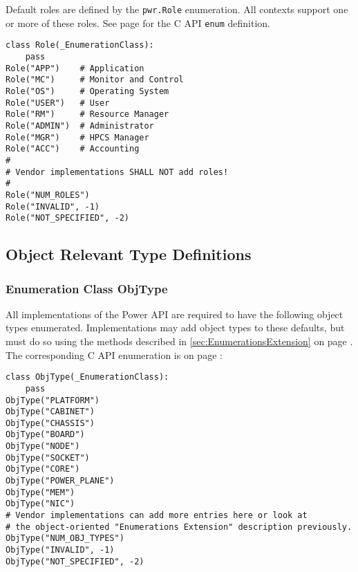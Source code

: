 \documentclass[12pt]{report} %
\begin{document}
\begin{appendices}
Default roles are defined by the \texttt{pwr.Role} enumeration. All
contexts support one or more of these roles. See page
\pageref{type:Role} for the C API \texttt{enum} definition.

\begin{center}\begin{minipage}{.95\linewidth}\begin{lstlisting}
class Role(_EnumerationClass):
    pass
Role("APP")    # Application
Role("MC")     # Monitor and Control
Role("OS")     # Operating System
Role("USER")   # User
Role("RM")     # Resource Manager
Role("ADMIN")  # Administrator
Role("MGR")    # HPCS Manager
Role("ACC")    # Accounting
#
# Vendor implementations SHALL NOT add roles!
#
Role("NUM_ROLES")
Role("INVALID", -1)
Role("NOT_SPECIFIED", -2)
\end{lstlisting}\end{minipage}\end{center}\label{sec:PythonPWRRoleDefinition}

\subsection{Object Relevant Type Definitions}
\label{sec:PythonObjectRelevantTypeDefinitions}

\subsubsection{Enumeration Class ObjType}\label{class:ObjType}

All implementations of the Power API are required to have the following object
types enumerated. Implementations may add object types to these defaults, but
must do so using the methods described in \ref{sec:EnumerationsExtension} on
page \pageref{sec:EnumerationsExtension}. The corresponding C API enumeration
is on page \pageref{type:ObjType}:

\begin{center}\begin{minipage}{.95\linewidth}\begin{lstlisting}
class ObjType(_EnumerationClass):
    pass
ObjType("PLATFORM")
ObjType("CABINET")
ObjType("CHASSIS")
ObjType("BOARD")
ObjType("NODE")
ObjType("SOCKET")
ObjType("CORE")
ObjType("POWER_PLANE")
ObjType("MEM")
ObjType("NIC")
# Vendor implementations can add more entries here or look at  
# the object-oriented "Enumerations Extension" description previously. 
ObjType("NUM_OBJ_TYPES")
ObjType("INVALID", -1)
ObjType("NOT_SPECIFIED", -2)
\end{lstlisting}\end{minipage}\end{center}


\end{appendices}
\end{document}
